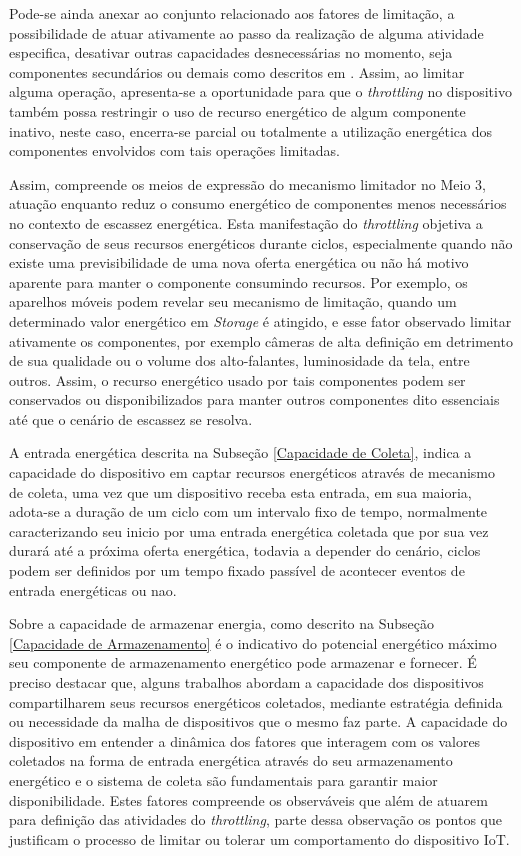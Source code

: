 Pode-se ainda anexar ao conjunto relacionado aos fatores de limitação, a possibilidade de atuar ativamente ao passo da realização de alguma atividade especifica, desativar outras capacidades desnecessárias no momento, seja componentes secundários ou demais como descritos em \cite{shen_energy-efficient_2019}. Assim, ao limitar alguma operação, apresenta-se a oportunidade para que o \textit{throttling} no dispositivo também possa restringir o uso de recurso energético de algum componente inativo, neste caso, encerra-se parcial ou totalmente a utilização energética dos componentes envolvidos com tais operações limitadas.  

Assim, compreende os meios de expressão do mecanismo limitador no Meio 3, atuação enquanto reduz o consumo energético de componentes menos necessários no contexto de escassez energética. Esta manifestação do \textit{throttling} objetiva a conservação de seus recursos energéticos durante ciclos, especialmente quando não existe uma previsibilidade de uma nova oferta energética ou não há motivo aparente para manter o componente consumindo recursos. Por exemplo, os aparelhos móveis podem revelar seu mecanismo de limitação, quando um determinado valor energético em \textit{Storage} é atingido, e esse fator observado limitar ativamente os componentes, por exemplo câmeras de alta definição em detrimento de sua qualidade ou o volume dos alto-falantes, luminosidade da tela, entre outros. Assim, o recurso energético usado por tais componentes podem ser conservados ou disponibilizados para manter outros componentes dito essenciais até que o cenário de escassez se resolva. 

A entrada energética descrita na Subseção \ref{Capacidade de Coleta}, indica a capacidade do dispositivo em captar recursos energéticos através de mecanismo de coleta, uma vez que um dispositivo receba esta entrada, em sua maioria, adota-se a duração de um ciclo com um intervalo fixo de tempo, normalmente caracterizando seu inicio por uma entrada energética coletada que por sua vez durará até a próxima oferta energética, todavia a depender do cenário, ciclos podem ser definidos por um tempo fixado passível de acontecer eventos de entrada energéticas ou nao.

Sobre a capacidade de armazenar energia, como descrito na Subseção \ref{Capacidade de Armazenamento} é o indicativo do potencial energético máximo seu componente de armazenamento energético pode armazenar e fornecer. É preciso destacar que, alguns trabalhos abordam a capacidade dos dispositivos compartilharem seus recursos energéticos coletados, mediante estratégia definida ou necessidade da malha de dispositivos que o mesmo faz parte. A capacidade do dispositivo em entender a dinâmica dos fatores que interagem com os valores coletados na forma de entrada energética através do seu armazenamento energético e o sistema de coleta são fundamentais para garantir maior disponibilidade. Estes fatores compreende os observáveis que além de atuarem para definição das atividades do \textit{throttling}, parte dessa observação os pontos que justificam o processo de limitar ou tolerar um comportamento do dispositivo \acs{IoT}.

